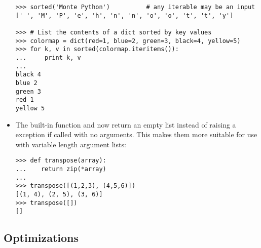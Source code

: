 \documentclass{howto}
\begin{document}
\begin{itemize}
\begin{verbatim}
>>> sorted('Monte Python')          # any iterable may be an input
[' ', 'M', 'P', 'e', 'h', 'n', 'n', 'o', 'o', 't', 't', 'y']

>>> # List the contents of a dict sorted by key values
>>> colormap = dict(red=1, blue=2, green=3, black=4, yellow=5)
>>> for k, v in sorted(colormap.iteritems()):
...     print k, v
...
black 4
blue 2
green 3
red 1
yellow 5

\end{verbatim}

\item The  built-in function and 
  now return an empty list instead of raising a 
  exception if called with no arguments.  This makes them more
  suitable for use with variable length argument lists:

\begin{verbatim}
>>> def transpose(array):
...    return zip(*array)
...
>>> transpose([(1,2,3), (4,5,6)])
[(1, 4), (2, 5), (3, 6)]
>>> transpose([])
[]
\end{verbatim}

\end{itemize}


\subsection{Optimizations}
\end{document}
